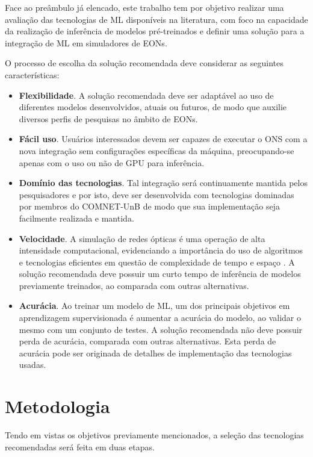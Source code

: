 Face ao preâmbulo já elencado, este trabalho tem por objetivo realizar uma avaliação das tecnologias de ML disponíveis na literatura, com foco na capacidade da realização de inferência de modelos pré-treinados e definir uma solução para a integração de ML em simuladores de EONs.

O processo de escolha da solução recomendada deve considerar as seguintes características:

\begin{itemize}
  \item \textbf{Flexibilidade}. A solução recomendada deve ser adaptável ao uso de diferentes modelos desenvolvidos, atuais ou futuros, de modo que auxilie diversos perfis de pesquisas no âmbito de EONs.
  \item \textbf{Fácil uso}. Usuários interessados devem ser capazes de executar o ONS com a nova integração sem configurações específicas da máquina, preocupando-se apenas com o uso ou não de GPU para inferência.
  \item \textbf{Domínio das tecnologias}. Tal integração será continuamente mantida pelos pesquisadores e por isto, deve ser desenvolvida com tecnologias dominadas por membros do COMNET-UnB de modo que sua implementação seja facilmente realizada e mantida.
  \item \textbf{Velocidade}. A simulação de redes ópticas é uma operação de alta intensidade computacional, evidenciando a importância do uso de algoritmos e tecnologias eficientes em questão de complexidade de tempo e espaço \cite{chehab_2019}. A solução recomendada deve possuir um curto tempo de inferência de modelos previamente treinados, ao comparada com outras alternativas.
  \item \textbf{Acurácia}. Ao treinar um modelo de ML, um dos principais objetivos em aprendizagem supervisionada é aumentar a acurácia do modelo, ao validar o mesmo com um conjunto de testes. A solução recomendada não deve possuir perda de acurácia, comparada com outras alternativas. Esta perda de acurácia pode ser originada de detalhes de implementação das tecnologias usadas.
\end{itemize}

\section{Metodologia}
\label{intro-methodology}

Tendo em vistas os objetivos previamente mencionados, a seleção das tecnologias recomendadas será feita em duas etapas.

